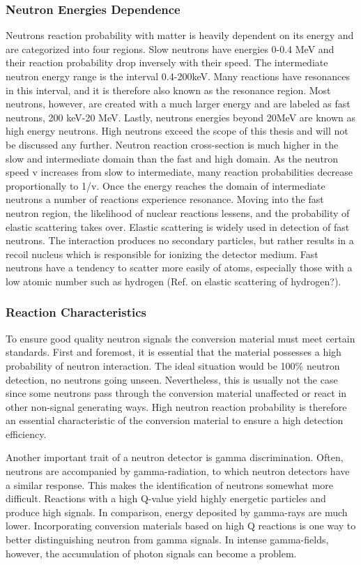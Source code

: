 \subsubsection{Neutron Energies Dependence}
Neutrons reaction probability with matter is heavily dependent on its energy and are categorized into four regions. Slow neutrons have energies 0-0.4 MeV and their reaction probability drop inversely with their speed. The intermediate neutron energy range is the interval 0.4-200keV. Many reactions have resonances in this interval, and it is therefore also known as the resonance region. Most neutrons, however, are created with a much larger energy and are labeled as fast neutrons, 200 keV-20 MeV. Lastly, neutrons energies beyond 20MeV are known as high energy neutrons. High neutrons exceed the scope of this thesis and will not be discussed any further.
Neutron reaction cross-section is much higher in the slow and intermediate domain than the fast and high domain. As the neutron speed v increases from slow to intermediate, many reaction probabilities decrease proportionally to 1/v. Once the energy reaches the domain of intermediate neutrons a number of reactions experience resonance. Moving into the fast neutron region, the likelihood of nuclear reactions lessens, and the probability of elastic scattering takes over.
Elastic scattering is widely used in detection of fast neutrons. The interaction produces no secondary particles, but rather results in a recoil nucleus which is responsible for ionizing the detector medium. Fast neutrons have a tendency to scatter more easily of atoms, especially those with a low atomic number such as hydrogen (Ref. on elastic scattering of hydrogen?).

\subsubsection{Reaction Characteristics}
To ensure good quality neutron signals the conversion material must meet certain standards. First and foremost, it is essential that the material possesses a high probability of neutron interaction. The ideal situation would be 100\% neutron detection, no neutrons going unseen. Nevertheless, this is usually not the case since some neutrons pass through the conversion material unaffected or react in other non-signal generating ways. High neutron reaction probability is therefore an essential characteristic of the conversion material to ensure a high detection efficiency.

Another important trait of a neutron detector is gamma discrimination. Often, neutrons are accompanied by gamma-radiation, to which neutron detectors have a similar response. This makes the identification of neutrons somewhat more difficult. Reactions with a high Q-value yield highly energetic particles and produce high signals. In comparison, energy deposited by gamma-rays are much lower. Incorporating conversion materials based on high Q reactions is one way to better distinguishing neutron from gamma signals. In intense gamma-fields, however, the accumulation of photon signals can become a problem.


